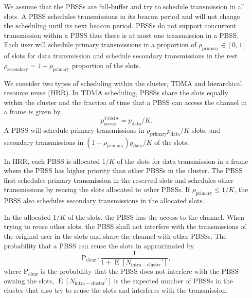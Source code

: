 \documentclass[10pt, conference, letterpaper]{IEEEtran}
\DeclareMathOperator*{\E}{\mathrm{E}}
\begin{document}
We assume that the PBSSs are full-buffer and try to schedule transmission in all slots. A PBSS schedules transmissions in its beacon period and will not change the scheduling until its next beacon period. PBSSs do not support concurrent transmission within a PBSS thus there is at most one transmission in a PBSS. Each user will schedule primary transmissions in a proportion of $\rho_{\mathrm{primary}}\in[0,1]$ of slots for data transmission and schedule secondary transmissions in the rest $\rho_{\mathrm{secondary}} =1 - \rho_{\mathrm{primary}}$ proportion of the slots. 

We consider two types of scheduling within the cluster, TDMA and hierarchical resource reuse (HRR). In TDMA scheduling, PBSSs share the slots equally within the cluster and the fraction of time that a PBSS can access the channel in a frame is given by, 
\begin{equation*}
p_{\mathrm{access}}^{\mathrm{TDMA}} = p_{\mathrm{data}}/K.
\end{equation*}
A PBSS will schedule primary transmissions in $\rho_{\mathrm{primary}}p_{\mathrm{data}}/K$ slots, and secondary transmissions in $(1-\rho_{\mathrm{primary}})p_{\mathrm{data}}/K$ of the slots. 

In HRR, each PBSS is allocated $1/K$ of the slots for data transmission in a frame where the PBSS has higher priority than other PBSSs in the cluster. The PBSS first schedules primary transmission in the reserved slots and schedules other transmissions by reusing the slots allocated to other PBSSs. If $\rho_{\mathrm{primary}}\leq 1/K$, the PBSS also schedules secondary transmissions in the allocated slots. 

In the allocated $1/K$ of the slots, the PBSS has the access to the channel. When trying to reuse other slots, the PBSS shall not interfere with the transmissions of the original user in the slots and share the channel with other PBSSs.
The probability that a PBSS can reuse the slots in approximated by
\begin{equation*}
\mathrm{P}_{\mathrm{clear}}\cdot \frac{1}{1+\E[N_{\mathrm{intra-cluster}}']},
\end{equation*}
where $\mathrm{P}_{\mathrm{clear}}$ is the probability that the PBSS does not interfere with the PBSS owning the slots, $\E[N_{\mathrm{intra-cluster}}']$ is the expected number of PBSSs in the cluster that also try to reuse the slots and interferes with the transmission.
\end{document}
